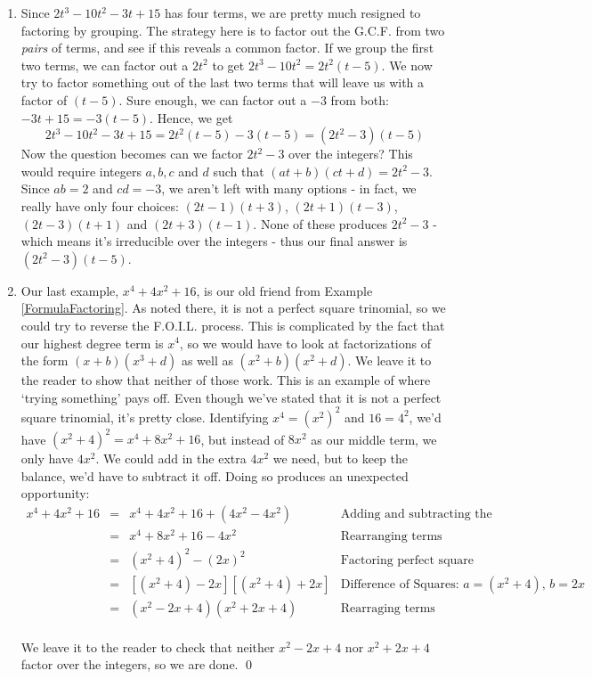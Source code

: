 \documentclass{ximera}
\begin{document}
\begin{example}
\begin{explanation}
\begin{enumerate}
\item Since $2t^3 - 10t^2 - 3t + 15$  has four terms, we are pretty much resigned to factoring by grouping.  The strategy here is to factor out the G.C.F. from two \textit{pairs} of terms, and see if this reveals a common factor. If we group the first two terms, we can factor out a $2t^2$ to get $2t^3 - 10t^2 = 2t^2(t-5)$.  We now try to factor something out of the last two terms that will leave us with a factor of $(t-5)$.  Sure enough, we can factor out a $-3$ from both:  $-3t + 15 = -3(t-5)$.  Hence, we get \[ 2t^3 - 10t^2 - 3t + 15 = 2t^2(t-5) - 3(t-5) = (2t^2-3)(t-5)\] Now the question becomes can we factor $2t^2 - 3$ over the integers?  This would require integers $a, b, c$ and $d$ such that $(at + b)(ct + d) = 2t^2 - 3$.   Since $ab = 2$ and $cd = -3$, we aren't left with many options - in fact, we really have only four choices:  $(2t - 1)(t+3)$, $(2t+1)(t-3)$, $(2t - 3)(t+1)$ and $(2t+3)(t-1)$.  None of these produces $2t^2 - 3$ - which means it's irreducible over the integers - thus our final answer is $(2t^2-3)(t-5)$.

\item  Our last example, $x^4 + 4x^2 + 16$, is our old friend from Example \ref{FormulaFactoring}.  As noted there, it is not a perfect square trinomial, so we could try to reverse the F.O.I.L. process. This is complicated by the fact that our highest degree term is $x^4$, so we would have to look at factorizations of the form $(x+b)(x^3+d)$ as well as $(x^2 + b)(x^2 + d)$.  We leave it to the reader to show that neither of those work.  This is an example of where `trying something' pays off.  Even though we've stated that it is not a perfect square trinomial, it's pretty close.  Identifying $x^4 = (x^2)^2$ and $16 = 4^2$, we'd have $(x^2 + 4)^2 = x^4 + 8x^2 + 16$, but instead of $8x^2$ as our middle term, we only have $4x^2$. We could add in the extra $4x^2$ we need, but to keep the balance, we'd have to subtract it off.  Doing so produces an unexpected opportunity: \[ \begin{array}{rclr}

x^4 + 4x^2 + 16 & = & x^4 + 4x^2 + 16 + (4x^2 - 4x^2) & \text{Adding and subtracting the same term} \\
                & = & x^4 + 8x^2 + 16 - 4x^2 & \text{Rearranging terms} \\
                & = & (x^2 + 4)^2 - (2x)^2 & \text{Factoring perfect square trinomial} \\
								& = & [(x^2 +4) - 2x][ (x^2 + 4) + 2x] & \text{Difference of Squares:  $a= (x^2 + 4)$, $b = 2x$}\\
								& = & (x^2 - 2x + 4)(x^2 + 2x + 4) & \text{Rearraging terms} \\

\end{array}\]

We leave it to the reader to check that neither $x^2 - 2x + 4$ nor $x^2 + 2x + 4$ factor over the integers, so we are done. \qed

\end{enumerate}
\end{explanation}
\end{example}
\end{document}
